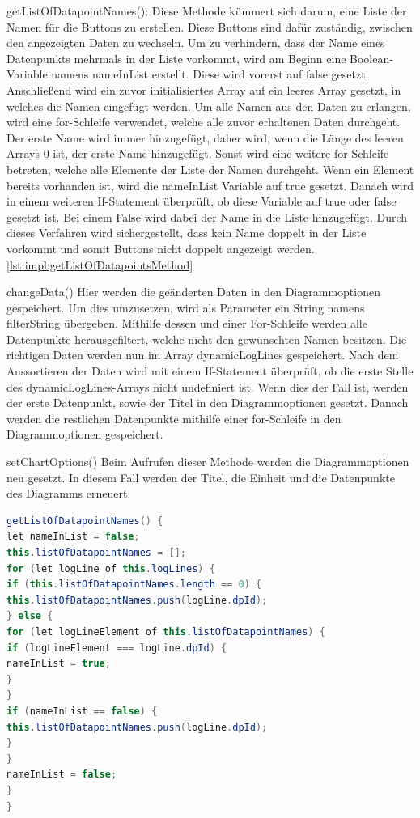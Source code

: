 \begin{compactitem}
\item getListOfDatapointNames(): Diese Methode kümmert sich darum, eine Liste der Namen für die Buttons zu erstellen. Diese Buttons sind dafür zuständig, zwischen den angezeigten Daten zu wechseln.
Um zu verhindern, dass der Name eines Datenpunkts mehrmals in der Liste vorkommt, wird am Beginn eine Boolean-Variable namens nameInList erstellt. Diese wird vorerst auf false gesetzt.
Anschließend wird ein zuvor initialisiertes Array auf ein leeres Array gesetzt, in welches die Namen eingefügt werden. Um alle Namen aus den Daten zu erlangen, wird eine for-Schleife verwendet, welche alle zuvor erhaltenen Daten durchgeht. Der erste Name wird immer hinzugefügt, daher wird, wenn die Länge des leeren Arrays 0 ist, der erste Name hinzugefügt. Sonst wird eine weitere for-Schleife betreten, welche alle Elemente der Liste der Namen durchgeht. Wenn ein Element bereits vorhanden ist, wird die nameInList Variable auf true gesetzt. Danach wird in einem weiteren If-Statement überprüft, ob diese Variable auf true oder false gesetzt ist. Bei einem False wird dabei der Name in die Liste hinzugefügt. Durch dieses Verfahren wird sichergestellt, dass kein Name doppelt in der Liste vorkommt und somit Buttons nicht doppelt angezeigt werden. \ref{lst:impl:getListOfDatapointsMethod}
\item changeData()
Hier werden die geänderten Daten in den Diagrammoptionen gespeichert. Um dies umzusetzen, wird als Parameter ein String namens filterString übergeben. Mithilfe dessen und einer For-Schleife werden alle Datenpunkte herausgefiltert, welche nicht den gewünschten Namen besitzen. Die richtigen Daten werden nun im Array dynamicLogLines gespeichert. Nach dem Aussortieren der Daten wird mit einem If-Statement überprüft, ob die erste Stelle des dynamicLogLines-Arrays nicht undefiniert ist. Wenn dies der Fall ist, werden der erste Datenpunkt, sowie der Titel in den Diagrammoptionen gesetzt. Danach werden die restlichen Datenpunkte mithilfe einer for-Schleife in den Diagrammoptionen gespeichert.
\item setChartOptions()
Beim Aufrufen dieser Methode werden die Diagrammoptionen neu gesetzt. In diesem Fall werden der Titel, die Einheit und die Datenpunkte des Diagramms erneuert.
\end{compactitem}


\newpage

\begin{lstlisting}[language=java,caption=getListOfDatapointNames()-Methode,label=lst:impl:getListOfDatapointsMethod]
getListOfDatapointNames() {
let nameInList = false;
this.listOfDatapointNames = [];
for (let logLine of this.logLines) {
if (this.listOfDatapointNames.length == 0) {
this.listOfDatapointNames.push(logLine.dpId);
} else {
for (let logLineElement of this.listOfDatapointNames) {
if (logLineElement === logLine.dpId) {
nameInList = true;
}
}
if (nameInList == false) {
this.listOfDatapointNames.push(logLine.dpId);
}
}
nameInList = false;
}
}
\end{lstlisting}


